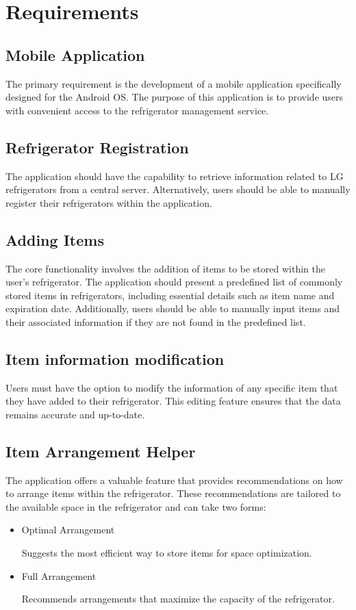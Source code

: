 \documentclass[conference]{IEEEtran}
\begin{document}
\section{Requirements}

\subsection{Mobile Application}
The primary requirement is the development of a mobile application specifically designed for the Android OS. The purpose of this application is to provide users with convenient access to the refrigerator management service.

\subsection{Refrigerator Registration}
The application should have the capability to retrieve information related to LG refrigerators from a central server. Alternatively, users should be able to manually register their refrigerators within the application.

\subsection{Adding Items}
The core functionality involves the addition of items to be stored within the user's refrigerator. The application should present a predefined list of commonly stored items in refrigerators, including essential details such as item name and expiration date. Additionally, users should be able to manually input items and their associated information if they are not found in the predefined list.

\subsection{Item information modification}
Users must have the option to modify the information of any specific item that they have added to their refrigerator. This editing feature ensures that the data remains accurate and up-to-date.

\subsection{Item Arrangement Helper}
The application offers a valuable feature that provides recommendations on how to arrange items within the refrigerator. These recommendations are tailored to the available space in the refrigerator and can take two forms:
\begin{itemize}
    \item Optimal Arrangement\par
    Suggests the most efficient way to store items for space optimization.
    \item Full Arrangement\par
    Recommends arrangements that maximize the capacity of the refrigerator.
\end{itemize}
\end{document}
